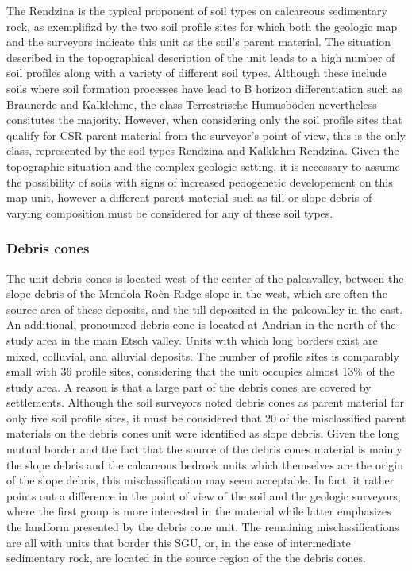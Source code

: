 \documentclass[preprint,12pt,authoryear]{elsarticle}
\begin{document}
The Rendzina is the typical proponent of soil types on calcareous sedimentary rock, as exemplifizd by the two soil profile sites for which both the geologic map and the surveyors indicate this unit as the soil's parent material. The situation described in the topographical description of the unit leads to a high number of soil profiles along with a variety of different soil types. Although these include soils where soil formation processes have lead to B horizon differentiation such as Braunerde and Kalklehme, the class Terrestrische Humusb\"oden nevertheless consitutes the majority. However, when considering only the soil profile sites that qualify for CSR parent material from the surveyor's point of view, this is the only class, represented by the soil types Rendzina  and Kalklehm-Rendzina. Given the topographic situation and the complex geologic setting, it is necessary to assume the possibility of soils with signs of increased pedogenetic developement on this map unit, however a different parent material such as till or slope debris of varying composition must be considered for any of these soil types. 

\subsubsection{Debris cones}
The unit debris cones is located west of the center of the paleavalley, between the slope debris of the Mendola-Ro\`en-Ridge slope in the west, which are often the source area of these deposits, and the till deposited in the paleovalley in the east. An additional, pronounced debris cone is located at Andrian in the north of the study area in the main Etsch valley. Units with which long borders exist are mixed, colluvial, and alluvial deposits. The number of profile sites is comparably small with 36 profile sites, considering that the unit occupies almost 13\% of the study area. A reason is that a large part of the debris cones are covered by settlements.  Although the soil surveyors noted debris cones as parent material for only five soil profile sites, it must be considered that 20 of the misclassified parent materials on the debris cones unit were  identified as slope debris. Given the long mutual border and the fact that the source of the debris cones material is mainly the slope debris and the calcareous bedrock units which themselves are the origin of the slope debris, this misclassification may seem acceptable. In fact, it rather points out a difference in the point of view of the soil and the geologic surveyors, where the first group is more interested in the material while latter emphasizes the landform presented by the debris cone unit. The remaining misclassifications are all with units that border this SGU, or, in the case of intermediate sedimentary rock, are located in the source region of the the debris cones.
\end{document}
